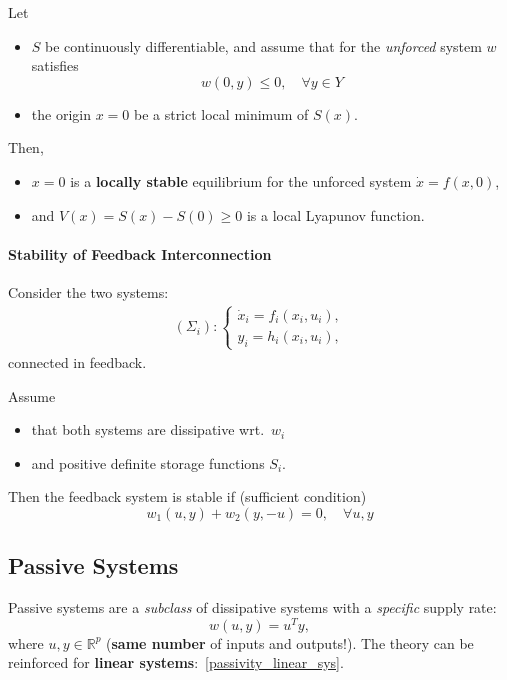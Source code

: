 Let
\begin{itemize}
    \item $S$ be continuously differentiable, and assume that for the \textit{unforced} system $w$ satisfies
          \begin{equation*}
              w(0, y) \leq 0, \quad \forall y \in Y
          \end{equation*}
    \item the origin $x = 0$ be a strict local minimum of $S(x)$.
\end{itemize}
\newpar{}
Then,
\begin{itemize}
    \item $x = 0$ is a \textbf{locally stable} equilibrium for the unforced system $\dot{x} = f(x, 0)$,
    \item and $V(x) = S(x) - S(0) \geq 0$ is a local Lyapunov function.
\end{itemize}

\paragraph{Stability of Feedback Interconnection}

Consider the two systems:
\begin{align*}
    (\Sigma_i) : \begin{cases}
                     \dot{x}_i = f_i(x_i, u_i), \\
                     y_i = h_i(x_i, u_i),
                 \end{cases}
\end{align*}
connected in feedback.

Assume
\begin{itemize}
    \item that both systems are dissipative wrt.\ $w_i$
    \item and positive definite storage functions $S_i$.
\end{itemize}
Then the feedback system is stable if (sufficient condition)
\begin{equation*}
    w_1(u, y) + w_2(y, -u) = 0, \quad \forall u, y
\end{equation*}

\subsection{Passive Systems}

Passive systems are a \textit{subclass} of dissipative systems with a \textit{specific} supply rate:
\begin{equation*}
    w(u, y) = u^T y,
\end{equation*}
where $u, y \in \mathbb{R}^p$ (\textbf{same number} of inputs and outputs!).
\newpar{}
The theory can be reinforced for \textbf{linear systems}:~\ref{passivity_linear_sys}.

